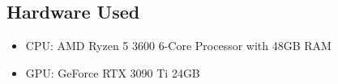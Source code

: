\documentclass[11pt,a4paper]{article}
\begin{document}
\subsection{Hardware Used}
\begin{itemize}
  \item CPU: AMD Ryzen 5 3600 6-Core Processor with 48GB RAM
  \item GPU: GeForce RTX 3090 Ti 24GB
\end{itemize}
\end{document}
